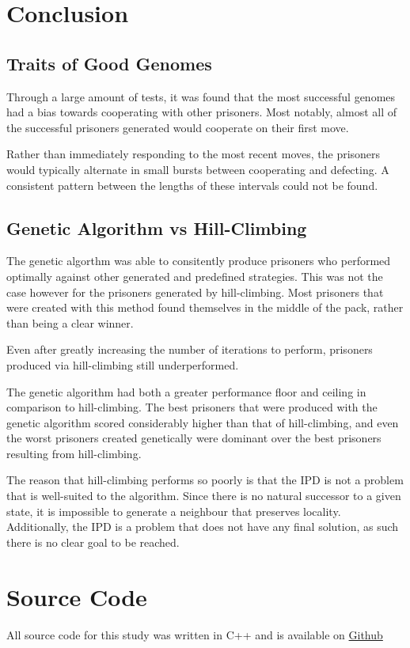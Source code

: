 \documentclass[12pt]{article}
\begin{document}
\section{Conclusion}

\subsection{Traits of Good Genomes}
Through a large amount of tests, it was found that the most successful genomes
had a bias towards cooperating with other prisoners. Most notably, almost all of
the successful prisoners generated would cooperate on their first move.

Rather than immediately responding to the most recent moves, the prisoners would
typically alternate in small bursts between cooperating and defecting. A consistent
pattern between the lengths of these intervals could not be found.

\subsection{Genetic Algorithm vs Hill-Climbing}
The genetic algorthm was able to consitently produce prisoners who performed
optimally against other generated and predefined strategies. This was not the
case however for the prisoners generated by hill-climbing. Most prisoners
that were created with this method found themselves in the middle of the pack,
rather than being a clear winner.

Even after greatly increasing the number of iterations to perform, prisoners
produced via hill-climbing still underperformed.

The genetic algorithm had both a greater performance floor and ceiling in comparison
to hill-climbing. The best prisoners that were produced with the genetic algorithm
scored considerably higher than that of hill-climbing, and even the worst
prisoners created genetically were dominant over the best prisoners resulting from
hill-climbing.

The reason that hill-climbing performs so poorly is that the IPD is not a problem
that is well-suited to the algorithm. Since there is no natural successor to a given state, it
is impossible to generate a neighbour that preserves locality. Additionally,
the IPD is a problem that does not have any final solution, as such there is no clear
goal to be reached.

\pagebreak

\section{Source Code}
All source code for this study was written in C++ and is
available on
\href{https://github.com/Quinny/IteratedPrisoners}{Github}
\end{document}
